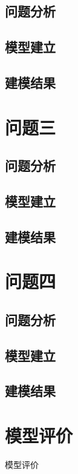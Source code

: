\documentclass[bwprint]{gmcmthesis}
\begin{document}
    \subsection{问题分析}

    \subsection{模型建立}

    \subsection{建模结果}

\section{问题三}   %
    \subsection{问题分析}

    \subsection{模型建立}

    \subsection{建模结果}

\section{问题四}   %
    \subsection{问题分析}

    \subsection{模型建立}

    \subsection{建模结果}

\section{模型评价}  %
模型评价
\end{document}
